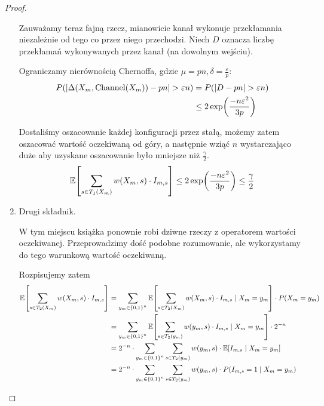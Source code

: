\begin{proof}
\begin{enumerate}
		      Zauważamy teraz fajną rzecz, mianowicie kanał wykonuje przekłamania niezależnie od tego co przez niego przechodzi.
		      Niech \( D \) oznacza liczbę przekłamań wykonywanych przez kanał (na dowolnym wejściu).

		      Ograniczamy nierównością Chernoffa, gdzie \( \mu = pn, \delta = \frac{\varepsilon}{p} \):
		      \begin{align*}
			      P(\abs{\Delta(X_m, \Channel(X_m)) - pn} > \varepsilon n)
			       & = P(\abs{D - pn} > \varepsilon n)           \\
			       & \leq 2\exp\pars{\frac{-n\varepsilon^2}{3p}}
		      \end{align*}

		      Dostaliśmy oszacowanie każdej konfiguracji przez stałą, możemy zatem oszacować wartość oczekiwaną od góry, a następnie wziąć \( n \) wystarczająco duże aby uzyskane oszacowanie było mniejsze niż \( \frac{\gamma}{2} \).
		      \[
			      \expected{\sum_{s \in T_1(X_m)} w(X_m, s) \cdot I_{m, s}} \leq 2\exp\pars{\frac{-n\varepsilon^2}{3p}}\leq \frac{\gamma}{2}
		      \]


		\item Drugi składnik.

		      W tym miejscu książka ponownie robi dziwne rzeczy z operatorem wartości oczekiwanej. Przeprowadzimy dość podobne rozumowanie, ale wykorzystamy do tego warunkową wartość oczekiwaną.

		      Rozpisujemy zatem
		      \begin{align*}
			      \expected{\sum_{s \in T_2(X_m)} w(X_m, s) \cdot I_{m, s}}
			       & = \sum_{y_m \in \set{0, 1}^n} \expected{\sum_{s \in T_2(X_m)} w(X_m, s) \cdot I_{m, s} \mid X_m = y_m} \cdot P(X_m = y_m) \\
			       & = \sum_{y_m \in \set{0, 1}^n} \expected{\sum_{s \in T_2(y_m)} w(y_m, s) \cdot I_{m, s} \mid X_m = y_m} \cdot 2^{-n}       \\
			       & = 2^{-n} \cdot \sum_{y_m \in \set{0, 1}^n} \sum_{s \in T_2(y_m)} w(y_m, s) \cdot \expected{I_{m, s} \mid X_m = y_m}       \\
			       & = 2^{-n} \cdot \sum_{y_m \in \set{0, 1}^n} \sum_{s \in T_2(y_m)} w(y_m, s) \cdot P(I_{m, s} = 1 \mid X_m = y_m)
		      \end{align*}


\end{enumerate}
\end{proof}
